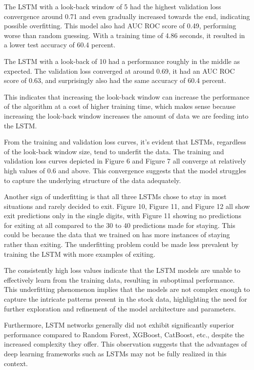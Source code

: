 \documentclass[11pt]{article}
\begin{document}
The LSTM with a look-back window of 5 had the highest validation loss convergence around 0.71 and even gradually increased towards the end, indicating possible overfitting. This model also had AUC ROC score of 0.49, performing worse than random guessing. With a training time of 4.86 seconds, it resulted in a lower test accuracy of 60.4 percent. 

The LSTM with a look-back of 10 had a performance roughly in the middle as expected. The validation loss converged at around 0.69, it had an AUC ROC score of 0.63, and surprisingly also had the same accuracy of 60.4 percent. 

This indicates that increasing the look-back window can increase the performance of the algorithm at a cost of higher training time, which makes sense because increasing the look-back window increases the amount of data we are feeding into the LSTM.

From the training and validation loss curves, it's evident that LSTMs, regardless of the look-back window size, tend to underfit the data. The training and validation loss curves depicted in Figure 6 and Figure 7 all converge at relatively high values of 0.6 and above. This convergence suggests that the model struggles to capture the underlying structure of the data adequately.

Another sign of underfitting is that all three LSTMs chose to stay in most situations and rarely decided to exit. Figure 10, Figure 11, and Figure 12 all show exit predictions only in the single digits, with Figure 11 showing no predictions for exiting at all compared to the 30 to 40 predictions made for staying. This could be because the data that we trained on has more instances of staying rather than exiting. The underfitting problem could be made less prevalent by training the LSTM with more examples of exiting.

The consistently high loss values indicate that the LSTM models are unable to effectively learn from the training data, resulting in suboptimal performance. This underfitting phenomenon implies that the models are not complex enough to capture the intricate patterns present in the stock data, highlighting the need for further exploration and refinement of the model architecture and parameters.

Furthermore, LSTM networks generally did not exhibit significantly superior performance compared to Random Forest, XGBoost, CatBoost, etc., despite the increased complexity they offer. This observation suggests that the advantages of deep learning frameworks such as LSTMs may not be fully realized in this context. 
\end{document}
